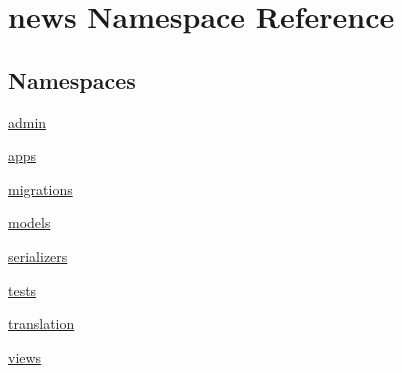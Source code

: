 \hypertarget{namespacenews}{}\section{news Namespace Reference}
\label{namespacenews}
\subsection*{Namespaces}
\begin{DoxyCompactItemize}
\item 
 \mbox{\hyperlink{namespacenews_1_1admin}{admin}}
\item 
 \mbox{\hyperlink{namespacenews_1_1apps}{apps}}
\item 
 \mbox{\hyperlink{namespacenews_1_1migrations}{migrations}}
\item 
 \mbox{\hyperlink{namespacenews_1_1models}{models}}
\item 
 \mbox{\hyperlink{namespacenews_1_1serializers}{serializers}}
\item 
 \mbox{\hyperlink{namespacenews_1_1tests}{tests}}
\item 
 \mbox{\hyperlink{namespacenews_1_1translation}{translation}}
\item 
 \mbox{\hyperlink{namespacenews_1_1views}{views}}
\end{DoxyCompactItemize}
